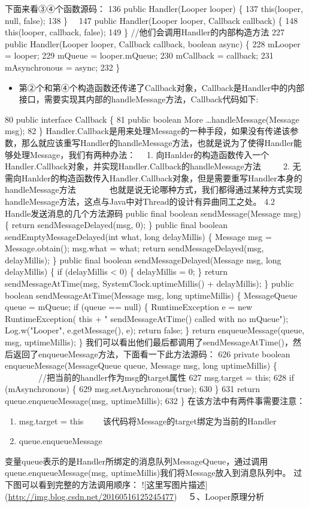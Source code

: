 \documentclass[9pt, b5paper]{article}
\begin{document}
下面来看③④个函数源码：
136    public Handler(Looper looper) \{
137        this(looper, null, false);
138    \}　
147    public Handler(Looper looper, Callback callback) \{
148        this(looper, callback, false);
149    \}
//他们会调用Handler的内部构造方法
227    public Handler(Looper looper, Callback callback, boolean async) \{
228        mLooper = looper;
229        mQueue = looper.mQueue;
230        mCallback = callback;
231        mAsynchronous = async;
232    \}
\begin{itemize}
\item 第②个和第④个构造函数还传递了Callback对象，Callback是Handler中的内部接口，需要实现其内部的handleMessage方法，Callback代码如下:
\end{itemize}
80     public interface Callback \{
81         public boolean More \ldots{}handleMessage(Message msg);
82     \}
Handler.Callback是用来处理Message的一种手段，如果没有传递该参数，那么就应该重写Handler的handleMessage方法，也就是说为了使得Handler能够处理Message，我们有两种办法： 
　1. 向Hanlder的构造函数传入一个Handler.Callback对象，并实现Handler.Callback的handleMessage方法 　
　2. 无需向Hanlder的构造函数传入Handler.Callback对象，但是需要重写Handler本身的handleMessage方法 　
　
　也就是说无论哪种方式，我们都得通过某种方式实现handleMessage方法，这点与Java中对Thread的设计有异曲同工之处。 
4.2　Handle发送消息的几个方法源码
   public final boolean sendMessage(Message msg)
    \{
        return sendMessageDelayed(msg, 0);
    \}
   public final boolean sendEmptyMessageDelayed(int what, long delayMillis) \{
        Message msg = Message.obtain();
        msg.what = what;
        return sendMessageDelayed(msg, delayMillis);
    \}
 public final boolean sendMessageDelayed(Message msg, long delayMillis)
    \{
        if (delayMillis < 0) \{
            delayMillis = 0;
        \}
        return sendMessageAtTime(msg, SystemClock.uptimeMillis() + delayMillis);
    \}
 public boolean sendMessageAtTime(Message msg, long uptimeMillis) \{
        MessageQueue queue = mQueue;
        if (queue == null) \{
            RuntimeException e = new RuntimeException(
                    this + " sendMessageAtTime() called with no mQueue");
            Log.w("Looper", e.getMessage(), e);
            return false;
        \}
        return enqueueMessage(queue, msg, uptimeMillis);
    \}
我们可以看出他们最后都调用了sendMessageAtTime()，然后返回了enqueueMessage方法，下面看一下此方法源码：
626    private boolean enqueueMessage(MessageQueue queue, Message msg, long uptimeMillis) \{
　　　　//把当前的handler作为msg的target属性
627        msg.target = this;
628        if (mAsynchronous) \{
629            msg.setAsynchronous(true);
630        \}
631        return queue.enqueueMessage(msg, uptimeMillis);
632    \}
在该方法中有两件事需要注意：  
\begin{enumerate}
\item msg.target = this 
　　该代码将Message的target绑定为当前的Handler
\item queue.enqueueMessage
\end{enumerate}
变量queue表示的是Handler所绑定的消息队列MessageQueue，通过调用queue.enqueueMessage(msg, uptimeMillis)我们将Message放入到消息队列中。
过下图可以看到完整的方法调用顺序： 
![这里写图片描述](\url{http://img.blog.csdn.net/20160516125245477})　
 ５、Looper原理分析
\end{document}
